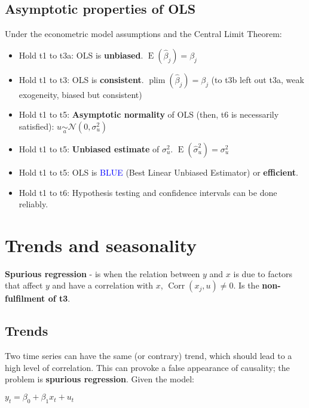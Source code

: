 \documentclass[10pt, a4paper, landscape]{article}
\DeclareMathOperator{\E}{E}
\DeclareMathOperator{\Corr}{Corr}
\begin{document}
\begin{multicols}{3}
\subsection*{Asymptotic properties of OLS}

Under the econometric model assumptions and the Central Limit Theorem:

\begin{itemize}[leftmargin=*]
	\item Hold t1 to t3a: OLS is \textbf{unbiased}. \( \E(\hat{\beta}_{j}) = \beta_{j} \)
	\item Hold t1 to t3: OLS is \textbf{consistent}. \( \operatorname{plim}(\hat{\beta}_{j}) = \beta_{j} \) (to t3b left out t3a, weak exogeneity, biased but consistent)
	\item Hold t1 to t5: \textbf{Asymptotic normality} of OLS (then, t6 is necessarily satisfied): \( u \underset{a}{\sim} \mathcal{N} (0, \sigma_{u}^{2}) \)
	\item Hold t1 to t5: \textbf{Unbiased estimate} of \( \sigma_{u}^{2} \). \( \E(\hat{\sigma}_{u}^{2}) = \sigma^{2}_{u} \)
	\item Hold t1 to t5: OLS is \textcolor{blue}{BLUE} (Best Linear Unbiased Estimator) or \textbf{efficient}.
	\item Hold t1 to t6: Hypothesis testing and confidence intervals can be done reliably.
\end{itemize}

\columnbreak

\section*{Trends and seasonality}

\textbf{Spurious regression} - is when the relation between \( y \) and \( x \) is due to factors that affect \( y \) and have a correlation with \( x \), \( \Corr(x_{j}, u) \neq 0 \). Is the \textbf{non-fulfilment of t3}.

\subsection*{Trends}

Two time series can have the same (or contrary) trend, which should lead to a high level of correlation. This can provoke a false appearance of causality; the problem is \textbf{spurious regression}. Given the model:

\begin{center}
	\( y_{t} = \beta_{0} + \beta_{1} x_{t} + u_{t} \)
\end{center}


\end{multicols}
\end{document}
